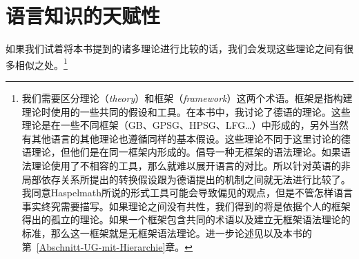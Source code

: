 %

\chapter{语言知识的天赋性}
\label{Abschnitt-Angeborenheit}\label{chap-innateness}
%

如果我们试着将本书提到的诸多理论进行比较的话，我们会发现这些理论之间有很多相似之处。\footnote{\label{fn-ffs}%
我们需要区分理论（\emph{theory}）和框架（\emph{framework}）这两个术语。框架是指构建理论时使用的一些共同的假设和工具。在本书中，我讨论了德语的理论。这些理论是在一些不同框架（GB、GPSG、HPSG、LFG\ldots ）中形成的，另外当然有其他语言的其他理论也遵循同样的基本假设。这些理论不同于这里讨论的德语理论，但他们是在同一框架内形成的。\citet{Haspelmath2010c}倡导一种无框架的语法理论。如果语法理论使用了不相容的工具，那么就难以展开语言的对比。所以针对英语的非局部依存关系所提出的转换假设跟为德语提出的\slasch 机制之间就无法进行比较了。我同意Haspelmath所说的形式工具可能会导致偏见的观点，但是不管怎样语言事实终究需要描写。如果理论之间没有共性，我们得到的将是依据个人的框架得出的孤立的理论。如果一个框架包含共同的术语以及建立无框架语法理论的标准，那么这一框架就是无框架语法理论。进一步论述见\citet{MuellerCoreGram}以及本书的第~\ref{Abschnitt-UG-mit-Hierarchie}章。
}
